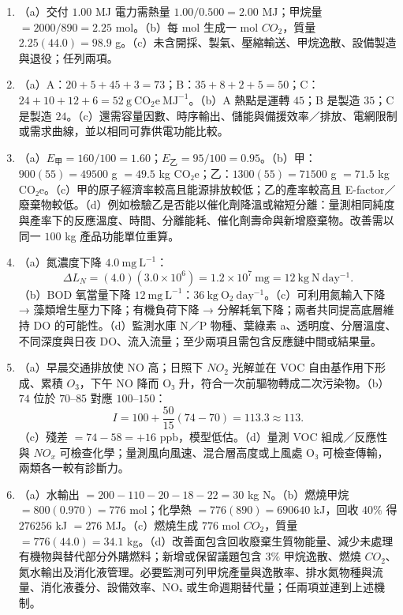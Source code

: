 \documentclass[11pt,a4paper]{article}
\begin{document}
\begin{enumerate}
\item
  （a）交付 \(1.00\) MJ 電力需熱量 \(1.00/0.500=2.00\) MJ；甲烷量 \(=2000/890=2.25\) mol。（b）每 mol 生成一 mol \(CO_2\)，質量 \(2.25(44.0)=98.9\) g。（c）未含開採、製氣、壓縮輸送、甲烷逸散、設備製造與退役；任列兩項。
\item
  （a）A：\(20+5+45+3=73\)；B：\(35+8+2+5=50\)；C：\(24+10+12+6=52\ \mathrm{g\ CO_2e\ MJ^{-1}}\)。（b）A 熱點是運轉 \(45\)；B 是製造 \(35\)；C 是製造 \(24\)。（c）還需容量因數、時序輸出、儲能與備援效率／排放、電網限制或需求曲線，並以相同可靠供電功能比較。
\item
  （a）\(E_{\text{甲}}=160/100=1.60\)；\(E_{\text{乙}}=95/100=0.95\)。（b）甲：\(900(55)=49500\) g \(=49.5\) kg CO₂e；乙：\(1300(55)=71500\) g \(=71.5\) kg CO₂e。（c）甲的原子經濟率較高且能源排放較低；乙的產率較高且 E-factor／廢棄物較低。（d）例如檢驗乙是否能以催化劑降溫或縮短分離：量測相同純度與產率下的反應溫度、時間、分離能耗、催化劑壽命與新增廢棄物。改善需以同一 \(100\) kg 產品功能單位重算。
\item
  （a）氮濃度下降 \(4.0\ \mathrm{mg\ L^{-1}}\)：
  \[
  \Delta L_N=(4.0)(3.0\times10^6)=1.2\times10^7\ \mathrm{mg}=12\ \mathrm{kg\ N\ day^{-1}}.
  \]
  （b）BOD 氧當量下降 \(12\ \mathrm{mg\ L^{-1}}\)：\(36\ \mathrm{kg\ O_2\ day^{-1}}\)。（c）可利用氮輸入下降 → 藻類增生壓力下降；有機負荷下降 → 分解耗氧下降；兩者共同提高底層維持 DO 的可能性。（d）監測水庫 N／P 物種、葉綠素 a、透明度、分層溫度、不同深度與日夜 DO、流入流量；至少兩項且需包含反應鏈中間或結果量。
\item
  （a）早晨交通排放使 NO 高；日照下 \(NO_2\) 光解並在 VOC 自由基作用下形成、累積 \(O_3\)，下午 NO 降而 O₃ 升，符合一次前驅物轉成二次污染物。（b）\(74\) 位於 \(70\)--\(85\) 對應 \(100\)--\(150\)：
  \[
  I=100+\frac{50}{15}(74-70)=113.3\approx113.
  \]
  （c）殘差 \(=74-58=+16\) ppb，模型低估。（d）量測 VOC 組成／反應性與 \(NO_x\) 可檢查化學；量測風向風速、混合層高度或上風處 O₃ 可檢查傳輸，兩類各一較有診斷力。
\item
  （a）水輸出 \(=200-110-20-18-22=30\) kg N。（b）燃燒甲烷 \(=800(0.970)=776\) mol；化學熱 \(=776(890)=690640\) kJ，回收 \(40\%\) 得 \(276256\) kJ \(=276\) MJ。（c）燃燒生成 \(776\) mol \(CO_2\)，質量 \(=776(44.0)=34.1\) kg。（d）改善面包含回收廢棄生質物能量、減少未處理有機物與替代部分外購燃料；新增或保留議題包含 \(3\%\) 甲烷逸散、燃燒 \(CO_2\)、氮水輸出及消化液管理。必要監測可列甲烷產量與逸散率、排水氮物種與流量、消化液養分、設備效率、NOₓ 或生命週期替代量；任兩項並連到上述機制。
\end{enumerate}
\end{document}
